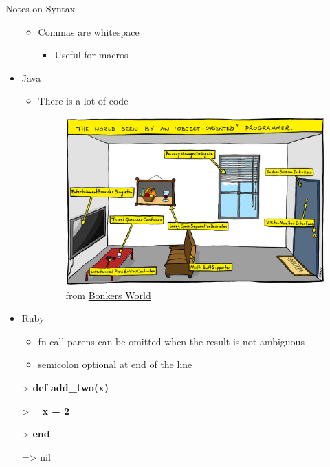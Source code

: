 \documentclass{beamer}
\begin{document}
\begin{frame}[allowframebreaks]{Notes on Syntax}
\begin{itemize}
\begin{itemize}
\begin{itemize}
      \end{itemize}
    \item Commas are whitespace
      \begin{itemize}
      \item Useful for macros
      \end{itemize}
    \end{itemize}
  \item Java
    \begin{itemize}
    \item There is a lot of code
      \begin{figure}
        \includegraphics[width=\linewidth]{object_oriented_programmer_world.png}
        \caption{from \href{http://www.bonkersworld.net/object-world/}{Bonkers World}}
      \end{figure}
    \end{itemize}
  \item Ruby\\
    \begin{itemize}
    \item fn call parens can be omitted when the result is not
      ambiguous
    \item semicolon optional at end of the line 
    \end{itemize}
{\ttfamily\color{black}
%
\textcolor[rgb]{0.0,0.0,0.8039216}{{\textgreater} }\textbf{def
add\_two(x)}}

{\ttfamily\color{black}
\textcolor[rgb]{0.0,0.0,0.8039216}{{\textgreater} }\ \ \textbf{x + 2}}

{\ttfamily\color{black}
\textcolor[rgb]{0.0,0.0,0.8039216}{{\textgreater} }\textbf{end}}

{\ttfamily\color{black}
={\textgreater} nil}


\end{itemize}
\end{frame}
\end{document}
